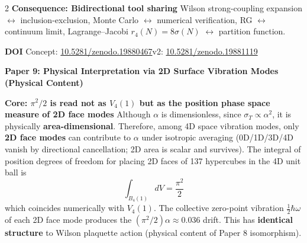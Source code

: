 \documentclass[9pt,a4paper]{article}
\begin{document}
\begin{multicols}{2}
\smallskip
\textbf{Consequence: Bidirectional tool sharing}\enspace
Wilson strong-coupling expansion $\leftrightarrow$ inclusion-exclusion, Monte Carlo $\leftrightarrow$ numerical verification, RG $\leftrightarrow$ continuum limit, Lagrange--Jacobi $r_4(N)=8\sigma(N)$ $\leftrightarrow$ partition function.

\smallskip
\textbf{DOI}\enspace
{\scriptsize Concept: \href{https://doi.org/10.5281/zenodo.19880467}{10.5281/zenodo.19880467}\enspace v2: \href{https://doi.org/10.5281/zenodo.19881119}{10.5281/zenodo.19881119}}

\end{multicols}

\newpage

\begin{center}
{\large\bfseries Paper 9: Physical Interpretation via 2D Surface Vibration Modes (Physical Content)}
\end{center}

\vspace{2pt}

\begin{tcolorbox}[colback=gray!7,colframe=gray!55,boxrule=0.4pt,arc=2pt,left=4pt,right=4pt,top=2pt,bottom=2pt]
{\small
\textbf{Core: $\pi^2/2$ is read not as $V_4(1)$ but as the position phase space measure of 2D face modes}\enspace
Although $\alpha$ is dimensionless, since $\sigma_T \propto \alpha^2$, it is physically \textbf{area-dimensional}. Therefore, among 4D space vibration modes, only \textbf{2D face modes} can contribute to $\alpha$ under isotropic averaging (0D/1D/3D/4D vanish by directional cancellation; 2D area is scalar and survives). The integral of position degrees of freedom for placing 2D faces of 137 hypercubes in the 4D unit ball is
\[ \int_{B_4(1)} dV = \frac{\pi^2}{2} \]
which coincides numerically with $V_4(1)$. The collective zero-point vibration $\tfrac{1}{2}\hbar\omega$ of each 2D face mode produces the $(\pi^2/2)\alpha \approx 0.036$ drift. This has \textbf{identical structure} to Wilson plaquette action (physical content of Paper 8 isomorphism).}
\end{tcolorbox}

\vspace{2pt}
\end{document}
